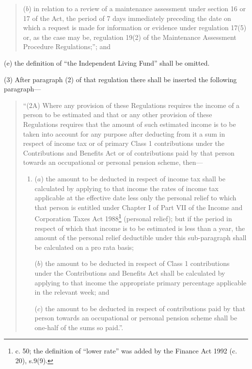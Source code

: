 \documentclass[12pt,a4paper]{article}
\begin{document}
\begin{enumerate}
\begin{quotation}
\begin{enumerate}
($b$) in relation to a review of a maintenance assessment under section 16 or 17 of the Act, the period of 7 days immediately preceding the date on which a request is made for information or evidence under regulation 17(5) or, as the case may be, regulation 19(2) of the Maintenance Assessment Procedure Regulations;”; and
\end{enumerate}
\end{quotation}

(e) the definition of “the Independent Living Fund” shall be omitted.
\end{enumerate}

(3) After paragraph (2) of that regulation there shall be inserted the following paragraph---
\begin{quotation}
“(2A) Where any provision of these Regulations requires the income of a person to be estimated and that or any other provision of these Regulations requires that the amount of such estimated income is to be taken into account for any purpose after deducting from it a sum in respect of income tax or of primary Class 1 contributions under the Contributions and Benefits Act or of contributions paid by that person towards an occupational or personal pension scheme, then---
\begin{enumerate}\item[]
($a$) the amount to be deducted in respect of income tax shall be calculated by applying to that income the rates of income tax applicable at the effective date less only the personal relief to which that person is entitled under Chapter I of Part VII of the Income and Corporation Taxes Act 1988\footnote{ c. 50; the definition of “lower rate” was added by the Finance Act 1992 (c. 20), s.9(9).} (personal relief); but if the period in respect of which that income is to be estimated is less than a year, the amount of the personal relief deductible under this sub-paragraph shall be calculated on a pro rata basis;

($b$) the amount to be deducted in respect of Class 1 contributions under the Contributions and Benefits Act shall be calculated by applying to that income the appropriate primary percentage applicable in the relevant week; and

($c$) the amount to be deducted in respect of contributions paid by that person towards an occupational or personal pension scheme shall be one-half of the sums so paid.”.
\end{enumerate}
\end{quotation}
\end{document}
